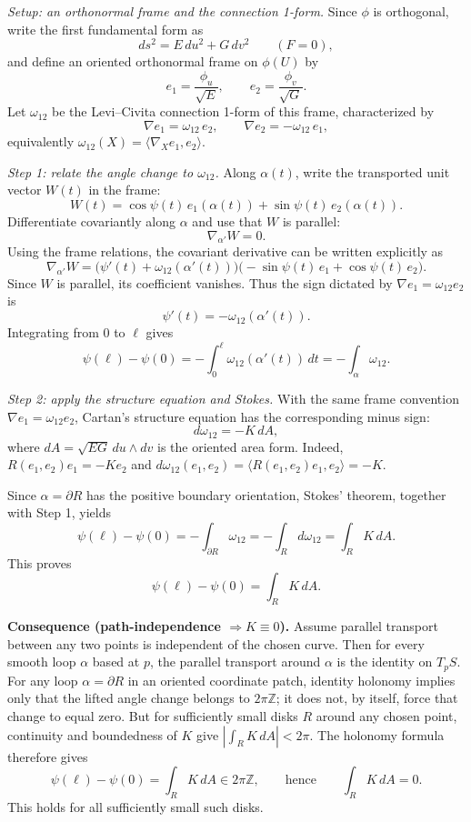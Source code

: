 \begin{solution}
\textit{Setup: an orthonormal frame and the connection 1-form.}
	Since $\phi$ is orthogonal, write the first fundamental form as
	\[
	ds^2 = E\,du^2 + G\,dv^2 \qquad (F=0),
	\]
	and define an oriented orthonormal frame on $\phi(U)$ by
	\[
	e_1=\frac{\phi_u}{\sqrt{E}},\qquad e_2=\frac{\phi_v}{\sqrt{G}}.
	\]
	Let $\omega_{12}$ be the Levi--Civita connection 1-form of this frame, characterized by
	\[
	\nabla e_1 = \omega_{12}\, e_2,\qquad \nabla e_2 = -\omega_{12}\, e_1,
	\]
	equivalently $\omega_{12}(X)=\langle \nabla_X e_1, e_2\rangle$.
	
	\textit{Step 1: relate the angle change to $\omega_{12}$.}
	Along $\alpha(t)$, write the transported unit vector $W(t)$ in the frame:
	\[
	W(t)=\cos\psi(t)\,e_1(\alpha(t))+\sin\psi(t)\,e_2(\alpha(t)).
	\]
	Differentiate covariantly along $\alpha$ and use that $W$ is parallel:
	\[
	\nabla_{\alpha'}W = 0.
	\]
	Using the frame relations, the covariant derivative can be written explicitly as
	\[
	\nabla_{\alpha'}W
	=\bigl(\psi'(t)+\omega_{12}(\alpha'(t))\bigr)
	\bigl(-\sin\psi(t)\,e_1+\cos\psi(t)\,e_2\bigr).
	\]
	Since $W$ is parallel, its coefficient vanishes. Thus the sign dictated by
	$\nabla e_1=\omega_{12}e_2$ is
	\[
	\boxed{\psi'(t)=-\omega_{12}(\alpha'(t))}.
	\]
	Integrating from $0$ to $\ell$ gives
	\[
	\psi(\ell)-\psi(0)
	=-\int_0^\ell\omega_{12}(\alpha'(t))\,dt
	=-\int_\alpha\omega_{12}.
	\]
	
	\textit{Step 2: apply the structure equation and Stokes.}
	With the same frame convention $\nabla e_1=\omega_{12}e_2$,
	Cartan's structure equation has the corresponding minus sign:
	\[
	\boxed{d\omega_{12}=-K\,dA},
	\]
	where $dA=\sqrt{EG}\,du\wedge dv$ is the oriented area form.
	Indeed, $R(e_1,e_2)e_1=-K e_2$ and
	$d\omega_{12}(e_1,e_2)=\langle R(e_1,e_2)e_1,e_2\rangle=-K$.
	
	Since $\alpha=\partial R$ has the positive boundary orientation,
	Stokes' theorem, together with Step 1, yields
	\[
	\psi(\ell)-\psi(0)
	=-\int_{\partial R}\omega_{12}
	=-\int_R d\omega_{12}
	=\int_R K\,dA.
	\]
	This proves
	\[
	\psi(\ell)-\psi(0)=\int_R K\,dA.
	\]
	
	\medskip
	
	\textbf{Consequence (path-independence $\Rightarrow K\equiv 0$).}
	Assume parallel transport between any two points is independent of the chosen curve.
	Then for every smooth loop $\alpha$ based at $p$, the parallel transport around $\alpha$ is the identity on $T_pS$.
	For any loop $\alpha=\partial R$ in an oriented coordinate patch,
	identity holonomy implies only that the lifted angle change belongs to
	$2\pi\mathbb Z$; it does not, by itself, force that change to equal zero.
	But for sufficiently small disks $R$ around any chosen point,
	continuity and boundedness of $K$ give
	$\left|\int_R K\,dA\right|<2\pi$.
	The holonomy formula therefore gives
	\[
	\psi(\ell)-\psi(0)=\int_R K\,dA\in 2\pi\mathbb Z,
	\qquad\text{hence}\qquad\int_R K\,dA=0.
	\]
	This holds for all sufficiently small such disks.
	

\end{solution}
